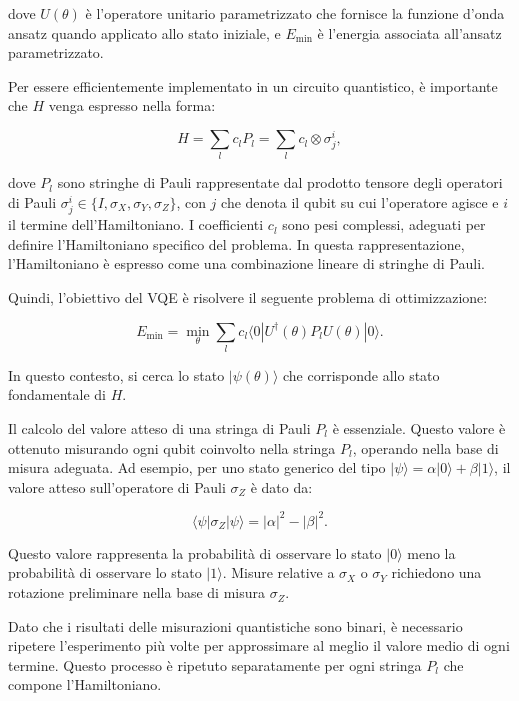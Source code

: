 dove $U(\theta)$ è l'operatore unitario parametrizzato che fornisce la funzione 
d'onda ansatz quando applicato allo stato iniziale, e $E_{\min}$ è l'energia 
associata all'ansatz parametrizzato.

Per essere efficientemente implementato in un circuito quantistico, è importante
che $H$ venga espresso nella forma:

\begin{equation}
    H = \sum_{l} c_l P_l = \sum_{l} c_l \otimes \sigma_j^i,
\end{equation}

dove \(P_l\) sono stringhe di Pauli rappresentate dal prodotto tensore degli 
operatori di Pauli \(\sigma_j^i \in \{I, \sigma_X, \sigma_Y, \sigma_Z\}\), 
con \(j\) che denota il qubit su cui l'operatore agisce e \(i\) il termine 
dell'Hamiltoniano. I coefficienti \(c_l\) sono pesi complessi, 
adeguati per definire l'Hamiltoniano specifico del problema. In questa 
rappresentazione, l'Hamiltoniano è espresso come una combinazione lineare 
di stringhe di Pauli.

Quindi, l'obiettivo del VQE è risolvere il seguente problema di ottimizzazione:

\begin{equation}
    E_{\text{min}} = \min_\theta \sum_{l} c_l \langle 0 | U^\dagger(\theta) P_l U(\theta) | 0 \rangle.
\end{equation}

In questo contesto, si cerca lo stato \(|\psi(\theta)\rangle\) che corrisponde 
allo stato fondamentale di \(H\).

Il calcolo del valore atteso di una stringa di Pauli \(P_l\) è essenziale. 
Questo valore è ottenuto misurando ogni qubit coinvolto nella stringa \(P_l\), 
operando nella base di misura adeguata. Ad esempio, per uno stato generico del 
tipo \(|\psi\rangle = \alpha |0\rangle + \beta |1\rangle\), il valore atteso 
sull'operatore di Pauli \(\sigma_Z\) è dato da:

\begin{equation}
    \langle \psi | \sigma_Z | \psi \rangle = |\alpha|^2 - |\beta|^2.
\end{equation}

Questo valore rappresenta la probabilità di osservare lo stato \(|0\rangle\) meno 
la probabilità di osservare lo stato \(|1\rangle\). Misure relative a \(\sigma_X\) 
o \(\sigma_Y\) richiedono una rotazione preliminare nella base di misura \(\sigma_Z\).

Dato che i risultati delle misurazioni quantistiche sono binari, è necessario 
ripetere l'esperimento più volte per approssimare al meglio il valore medio 
di ogni termine. Questo processo è ripetuto separatamente per ogni stringa 
\(P_l\) che compone l'Hamiltoniano.

